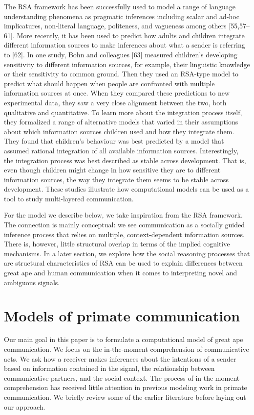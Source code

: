 \documentclass[
  man,floatsintext]{apa6}
\begin{document}
The RSA framework has been successfully used to model a range of language understanding phenomena as pragmatic inferences including scalar and ad-hoc implicatures, non-literal language, politeness, and vagueness among others {[}55,57--61{]}. More recently, it has been used to predict how adults and children integrate different information sources to make inferences about what a sender is referring to {[}62{]}. In one study, Bohn and colleagues {[}63{]} measured children's developing sensitivity to different information sources, for example, their linguistic knowledge or their sensitivity to common ground. Then they used an RSA-type model to predict what should happen when people are confronted with multiple information sources at once. When they compared these predictions to new experimental data, they saw a very close alignment between the two, both qualitative and quantitative. To learn more about the integration process itself, they formalized a range of alternative models that varied in their assumptions about which information sources children used and how they integrate them. They found that children's behaviour was best predicted by a model that assumed rational integration of all available information sources. Interestingly, the integration process was best described as stable across development. That is, even though children might change in how sensitive they are to different information sources, the way they integrate them seems to be stable across development. These studies illustrate how computational models can be used as a tool to study multi-layered communication.

For the model we describe below, we take inspiration from the RSA framework. The connection is mainly conceptual: we see communication as a socially guided inference process that relies on multiple, context-dependent information sources. There is, however, little structural overlap in terms of the implied cognitive mechanisms. In a later section, we explore how the social reasoning processes that are structural characteristics of RSA can be used to explain differences between great ape and human communication when it comes to interpreting novel and ambiguous signals.

\hypertarget{models-of-primate-communication}{%
\section{Models of primate communication}\label{models-of-primate-communication}}

Our main goal in this paper is to formulate a computational model of great ape communication. We focus on the in-the-moment comprehension of communicative acts. We ask how a receiver makes inferences about the intentions of a sender based on information contained in the signal, the relationship between communicative partners, and the social context. The process of in-the-moment comprehension has received little attention in previous modeling work in primate communication. We briefly review some of the earlier literature before laying out our approach.
\end{document}
